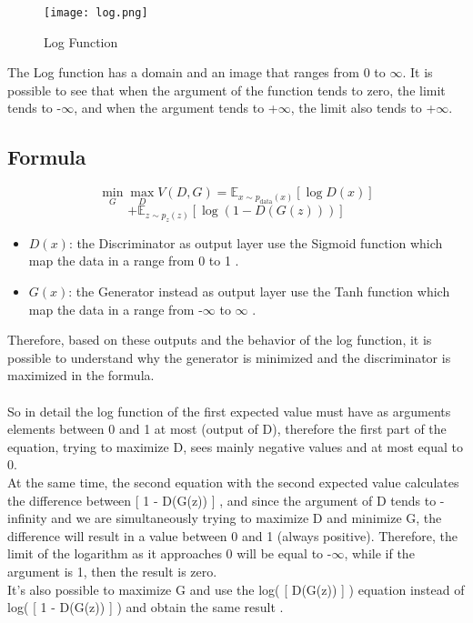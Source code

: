 
\begin{figure}[h!]
\texttt{[image: log.png]}
\caption{Log Function}
\end{figure}
The Log function has a domain and an image that ranges from 0 to $\infty$.
It is possible to see that when the argument of the function tends to zero, the limit tends to -$\infty$, 
and when the argument tends to +$\infty$, the limit also tends to +$\infty$.

\subsection*{Formula}
\begin{equation}
    \min_{G} \max_{D} V(D, G) = \mathbb{E}_{x \sim p_{\text{data}}(x)}[\log D(x)] 
\end{equation}
\[
+ \mathbb{E}_{z \sim p_z(z)}[\log(1 - D(G(z)))]
\]
\begin{itemize}
    \item $D(x)$: the Discriminator as output layer use the Sigmoid function which map the data in a
    range from 0 to 1 .
    \item $G(x)$: the Generator instead as output layer use the Tanh function which map the data in a
    range from -$\infty$ to $\infty$ .
\end{itemize}

Therefore, based on these outputs and the behavior of the log function, it is possible to understand why 
the generator is minimized and the discriminator is maximized in the formula.
\\\\
So in detail the log function of the first expected value must have as arguments elements between 0 and 1 at most 
(output of D), therefore the first part of the equation, trying to maximize D, sees mainly negative values and at 
most equal to 0. \\
At the same time, the second equation with the second expected value calculates the difference between [ 1 - D(G(z)) ] 
, and since the argument of D tends to -infinity and we are simultaneously trying to maximize D and minimize G, 
the difference will result in a value between 0 and 1 (always positive).
Therefore, the limit of the logarithm as it approaches 0 will be equal to -$\infty$, 
while if the argument is 1, then the result is zero. \\
It's also possible to maximize G and use the log( [ D(G(z)) ] ) equation instead of log( [ 1 - D(G(z)) ] ) and 
obtain the same result . 


